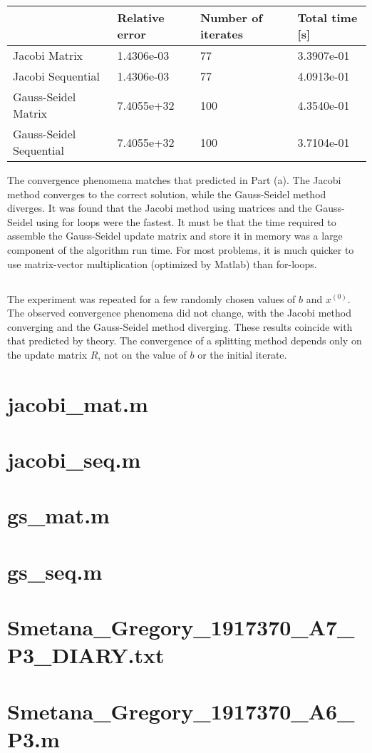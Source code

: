 \documentclass[11pt]{article} %
\begin{document}
\begin{table}[h!]
\centering
\begin{tabular}{| l | l | l|l |}\hline
 & Relative error & Number of iterates & Total time [s] \\ \hline
 Jacobi  Matrix & 1.4306e-03 &  77  &    3.3907e-01 \\ \hline
 Jacobi Sequential  &    1.4306e-03  &77  &    4.0913e-01  \\ \hline
Gauss-Seidel Matrix&   7.4055e+32& 100 &      4.3540e-01    \\ \hline
Gauss-Seidel Sequential &    7.4055e+32 & 100  &      3.7104e-01 \\ \hline
\end{tabular}
\caption{}
\label{tab:3c}
\end{table}


The convergence phenomena matches that predicted in Part (a). The Jacobi method converges to the correct solution, while the Gauss-Seidel method diverges. It was found that the Jacobi method using matrices and the Gauss-Seidel using for loops were the fastest. It must be that the time required to assemble the Gauss-Seidel update matrix and store it in memory was a large component of the algorithm run time. For most problems, it is much quicker to use matrix-vector multiplication (optimized by Matlab) than for-loops.

\subsection{} %
The experiment was repeated for a few randomly chosen values of $b$ and $x^{(0)}$. The observed convergence phenomena did not change, with the Jacobi method converging and the Gauss-Seidel method diverging. These results coincide with that predicted by theory. The convergence of a splitting method depends only on the update matrix $R$, not on the value of $b$ or the initial iterate.

\clearpage
\appendix
\section{jacobi\_mat.m}


\section{jacobi\_seq.m}


\section{gs\_mat.m}


\section{gs\_seq.m}


\section{Smetana\_Gregory\_1917370\_A7\_P3\_DIARY.txt}


\section{Smetana\_Gregory\_1917370\_A6\_P3.m}

\end{document}

